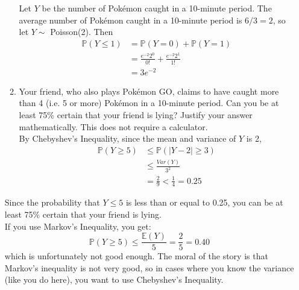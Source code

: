 \documentclass[12pt]{article}
\def\P{{\mathbb P}}
\def\E{{\mathbb E}}
\begin{document}
\begin{enumerate}
\begin{enumerate}
Let $Y$ be the number of Pok\'emon caught in a 10-minute period. The average number of Pok\'emon caught in a 10-minute period is $6/3 = 2$, so let $Y \sim $ Poisson(2). Then
\begin{align*}
\P(Y \leq 1) &= \P(Y = 0) + \P(Y = 1) \\
&= \frac{e^{-2} 2^0}{0!} + \frac{e^{-2} 2^1}{1!} \\
&= 3 e^{-2}
\end{align*}

\item Your friend, who also plays Pok\'emon GO, claims to have caught more than 4 (i.e. 5 or more) Pok\'emon in a 10-minute period. Can you be at least 75\% certain that your friend is lying? Justify your answer mathematically. This does not require a calculator.\\

By Chebyshev's Inequality, since the mean and variance of $Y$ is 2,
\begin{align*}
\P(Y \geq 5) &\leq \P( |Y - 2| \geq 3) \\
&\leq \frac{Var(Y)}{3^2} \\
&=\frac{2}{9} < \frac{1}{4} = 0.25
\end{align*}
\end{enumerate}
Since the probability that $Y \leq 5$ is less than or equal to 0.25, you can be at least 75\% certain that your friend is lying.\\

If you use Markov's Inequality, you get:
\[
\P(Y \geq 5) \leq \frac{\E(Y)}{5} = \frac{2}{5} = 0.40
\] 
which is unfortunately not good enough. The moral of the story is that Markov's inequality is not very good, so in cases where you know the variance (like you do here), you want to use Chebyshev's Inequality.
\end{enumerate}
\end{document}
